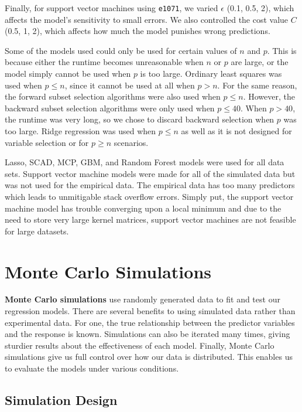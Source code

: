 \documentclass{article}
\begin{document}
Finally, for support vector machines using \lstinline!e1071!, we varied $\epsilon$ (0.1, 0.5, 2), which affects the model's sensitivity to small errors. We also controlled the cost value $C$ (0.5, 1, 2), which affects how much the model punishes wrong predictions.

Some of the models used could only be used for certain values of $n$ and $p$. This is because either the runtime becomes unreasonable when $n$ or $p$ are large, or the model simply cannot be used when $p$ is too large. Ordinary least squares was used when $p\leq n$, since it cannot be used at all when $p>n$. For the same reason, the forward subset selection algorithms were also used when $p\leq n$. However, the backward subset selection algorithms were only used when $p\leq 40$. When $p>40$, the runtime was very long, so we chose to discard backward selection when $p$ was too large. Ridge regression was used when $p\leq n$ as well as it is not designed for variable selection or for $p \geq n$ scenarios.

Lasso, SCAD, MCP, GBM, and Random Forest models were used for all data sets. Support vector machine models were made for all of the simulated data but was not used for the empirical data. The empirical data has too many predictors which leads to unmitigable stack overflow errors. Simply put, the support vector machine model has trouble converging upon a local minimum and due to the need to store very large kernel matrices, support vector machines are not feasible for large datasets.

\section{Monte Carlo Simulations}

\textbf{Monte Carlo simulations} use randomly generated data to fit and test our regression  models. There are several benefits to using simulated data rather than experimental data. For one, the true relationship between the predictor variables and the response is known. Simulations can also be iterated many times, giving sturdier results about the effectiveness of each model. Finally, Monte Carlo simulations give us full control over how our data is distributed. This enables us to evaluate the models under various conditions.


\subsection{Simulation Design}
\end{document}
